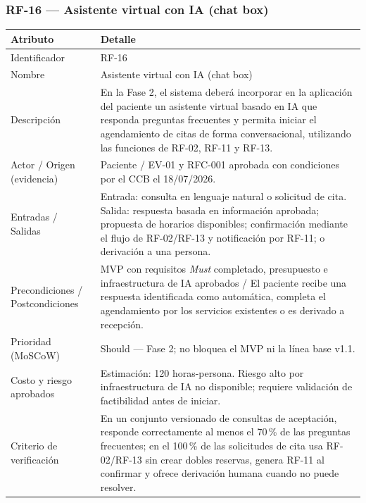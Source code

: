 \documentclass[11pt,a4paper]{article}
\begin{document}
	\subsubsection{RF-16 --- Asistente virtual con IA (chat box)}
	
	\begin{longtable}{p{} p{}}
		
		\toprule
		\textbf{Atributo} & \textbf{Detalle} \\
		\midrule
		\endhead
		
		Identificador & RF-16 \\
		Nombre & Asistente virtual con IA (chat box) \\
		Descripción & En la Fase 2, el sistema deberá incorporar en la aplicación del paciente un asistente virtual basado en IA que responda preguntas frecuentes y permita iniciar el agendamiento de citas de forma conversacional, utilizando las funciones de RF-02, RF-11 y RF-13. \\
		Actor / Origen (evidencia) & Paciente / EV-01 y RFC-001 aprobada con condiciones por el CCB el 18/07/2026. \\
		Entradas / Salidas & Entrada: consulta en lenguaje natural o solicitud de cita. Salida: respuesta basada en información aprobada; propuesta de horarios disponibles; confirmación mediante el flujo de RF-02/RF-13 y notificación por RF-11; o derivación a una persona. \\
		Precondiciones / Postcondiciones & MVP con requisitos \emph{Must} completado, presupuesto e infraestructura de IA aprobados / El paciente recibe una respuesta identificada como automática, completa el agendamiento por los servicios existentes o es derivado a recepción. \\
		Prioridad (MoSCoW) & Should --- Fase 2; no bloquea el MVP ni la línea base v1.1. \\
		Costo y riesgo aprobados & Estimación: 120 horas-persona. Riesgo alto por infraestructura de IA no disponible; requiere validación de factibilidad antes de iniciar. \\
		Criterio de verificación & En un conjunto versionado de consultas de aceptación, responde correctamente al menos el 70\,\% de las preguntas frecuentes; en el 100\,\% de las solicitudes de cita usa RF-02/RF-13 sin crear dobles reservas, genera RF-11 al confirmar y ofrece derivación humana cuando no puede resolver. \\
		\bottomrule
	\end{longtable}
	
\end{document}
